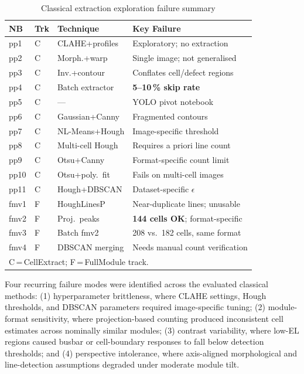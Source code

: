 \documentclass[conference]{IEEEtran}
\begin{document}
\begin{table}[t]
  \caption{Classical extraction exploration failure summary}
  \label{tab:classical_all}
  \begin{center}
  \renewcommand{\arraystretch}{0.9}\scriptsize
  \begin{tabular}{p{0.55cm}p{0.35cm}p{1.65cm}p{3.55cm}}
    \toprule
    \textbf{NB} & \textbf{Trk} & \textbf{Technique} & \textbf{Key Failure}\\
    \midrule
    pp1  & C & CLAHE+profiles   & Exploratory; no extraction\\
    pp2  & C & Morph.+warp      & Single image; not generalised\\
    pp3  & C & Inv.+contour     & Conflates cell/defect regions\\
    pp4  & C & Batch extractor  & \textbf{5--10\,\% skip rate}\\
    pp5  & C & ---              & YOLO pivot notebook\\
    pp6  & C & Gaussian+Canny   & Fragmented contours\\
    pp7  & C & NL-Means+Hough   & Image-specific threshold\\
    pp8  & C & Multi-cell Hough & Requires a priori line count\\
    pp9  & C & Otsu+Canny       & Format-specific count limit\\
    pp10 & C & Otsu+poly.\ fit  & Fails on multi-cell images\\
    pp11 & C & Hough+DBSCAN     & Dataset-specific $\epsilon$\\
    \midrule
    fmv1 & F & HoughLinesP      & Near-duplicate lines; unusable\\
    fmv2 & F & Proj.\ peaks     & \textbf{144 cells OK}; format-specific\\
    fmv3 & F & Batch fmv2       & 208 vs.\ 182 cells, same format\\
    fmv4 & F & DBSCAN merging   & Needs manual count verification\\
    \bottomrule
    \multicolumn{4}{l}{\scriptsize C\,=\,CellExtract; F\,=\,FullModule track.}
  \end{tabular}
  \end{center}
\end{table}

Four recurring failure modes were identified across the evaluated classical methods: (1) hyperparameter brittleness, where CLAHE settings, Hough thresholds, and DBSCAN parameters required image-specific tuning; (2) module-format sensitivity, where projection-based counting produced inconsistent cell estimates across nominally similar modules; (3) contrast variability, where low-EL regions caused busbar or cell-boundary responses to fall below detection thresholds; and (4) perspective intolerance, where axis-aligned morphological and line-detection assumptions degraded under moderate module tilt.
\end{document}
